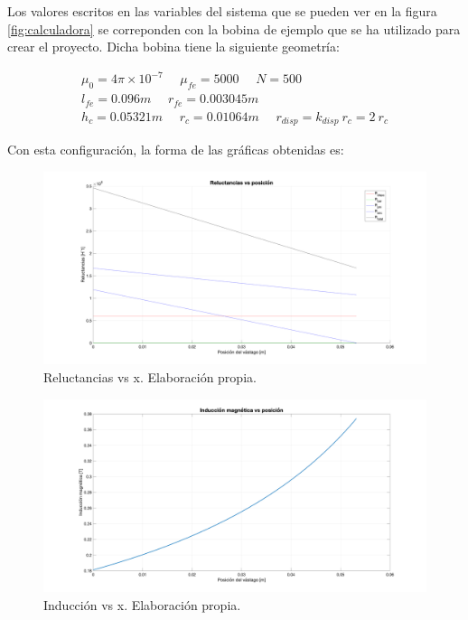 Los valores escritos en las variables del sistema que se pueden ver en la figura \ref{fig:calculadora} se correponden con la bobina de ejemplo que se ha utilizado para crear el proyecto. Dicha bobina tiene la siguiente geometría:

\[
\begin{array}{c}
    \mu_0 = 4\pi \times 10^{-7}~~~~~~\mu_{fe} = 5000~~~~~~N = 500 \\
    l_{fe} = 0.096m~~~~~~r_{fe} = 0.003045m \\
    h_c = 0.05321m~~~~~~r_{c} = 0.01064m~~~~~~r_{disp} = k_{disp}~r_{c}=2~r_{c}
\end{array}
\]

Con esta configuración, la forma de las gráficas obtenidas es:

\begin{figure}[H]
    \centering
    \includegraphics[width=13cm]{FigurasMemoria/calcRsetupBase.png}
    \caption{Reluctancias vs x. Elaboración propia.}
    \label{fig:calcRsetupBase} %
\end{figure}

\begin{figure}[H]
    \centering
    \includegraphics[width=\linewidth]{FigurasMemoria/calcBsetupBase.png}
    \caption{Inducción vs x. Elaboración propia.}
    \label{fig:calcBsetupBase} %
\end{figure}

